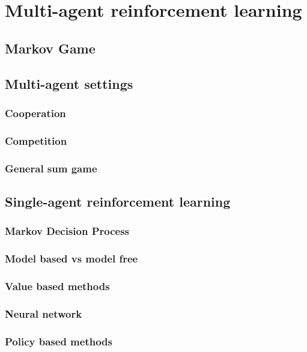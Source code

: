 \chapter{Multi-agent reinforcement learning}\label{ch:marl}

\section{Markov Game}
\section{Multi-agent settings}
\subsection{Cooperation}
\subsection{Competition}
\subsection{General sum game}
\section{Single-agent reinforcement learning}
\subsection{Markov Decision Process}
\subsection{Model based vs model free}
\subsection{Value based methods}
\subsection{Neural network}
\subsection{Policy based methods}